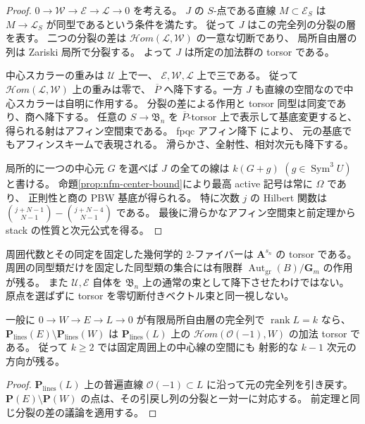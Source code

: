 \begin{proof}
$0\to\mathcal W\to\mathcal E\to\mathcal L\to0$ を考える。
$J$ の $S$-点である直線 $M\subset\mathcal E_S$ は
$M\to\mathcal L_S$ が同型であるという条件を満たす。
従って $J$ はこの完全列の分裂の層を表す。
二つの分裂の差は $\mathcal{H}om(\mathcal L,\mathcal W)$ の一意な切断であり、
局所自由層の列は Zariski 局所で分裂する。
よって $J$ は所定の加法群の torsor である。

中心スカラーの重みは $\mathcal U$ 上で一、
$\mathcal E,\mathcal W,\mathcal L$ 上で三である。
従って $\mathcal{H}om(\mathcal L,\mathcal W)$ 上の重みは零で、
$\overline P$ へ降下する。一方 $J$ も直線の空間なので中心スカラーは自明に作用する。
分裂の差による作用と torsor 同型は同変であり、商へ降下する。
任意の $S\to\mathfrak B_n$ を $\overline P$-torsor 上で表示して基底変更すると、
得られる射はアフィン空間束である。
fpqc アフィン降下 \cite[Lemma~35.37.1, Tag~0245]{NFMStacksAffineDescent} により、
元の基底でもアフィンスキームで表現される。
滑らかさ、全射性、相対次元も降下する。

局所的に一つの中心元 $G$ を選べば $J$ の全ての線は $k(G+g)$
$(g\in\operatorname{Sym}^3U)$ と書ける。
命題\ref{prop:nfm-center-bound}により最高 active 記号は常に $\Omega$ であり、
正則性と商の PBW 基底が得られる。
特に次数 $j$ の Hilbert 関数は
$\binom{j+N-1}{N-1}-\binom{j+N-4}{N-1}$ である。
最後に滑らかなアフィン空間束と前定理から stack の性質と次元公式を得る。
\end{proof}

\begin{remark}[ファイバーの意味]
周囲代数とその同定を固定した幾何学的 $2$-ファイバーは
$\mathbf A^{s_n}$ の torsor である。
周囲の同型類だけを固定した同型類の集合には有限群
$\operatorname{Aut}_{\mathrm{gr}}(B)/\mathbf G_m$ の作用が残る。
また $\mathcal U,\mathcal E$ 自体を $\mathfrak B_n$ 上の通常の束として降下させたわけではない。
原点を選ばずに torsor を零切断付きベクトル束と同一視しない。
\end{remark}

\begin{proposition}[複数ブロックでの正しい相対形]
\label{prop:nfm-multiblock-torsor}
一般に $0\to W\to E\to L\to0$ が有限局所自由層の完全列で
$\operatorname{rank}L=k$ なら、
$\mathbf P_{\mathrm{lines}}(E)\setminus\mathbf P_{\mathrm{lines}}(W)$ は
$\mathbf P_{\mathrm{lines}}(L)$ 上の
$\mathcal{H}om(\mathcal O(-1),W)$ の加法 torsor である。
従って $k\geq2$ では固定周囲上の中心線の空間にも
射影的な $k-1$ 次元の方向が残る。
\end{proposition}
\begin{proof}
$\mathbf P_{\mathrm{lines}}(L)$ 上の普遍直線
$\mathcal O(-1)\subset L$ に沿って元の完全列を引き戻す。
$\mathbf P(E)\setminus\mathbf P(W)$ の点は、その引戻し列の分裂と一対一に対応する。
前定理と同じ分裂の差の議論を適用する。
\end{proof}

